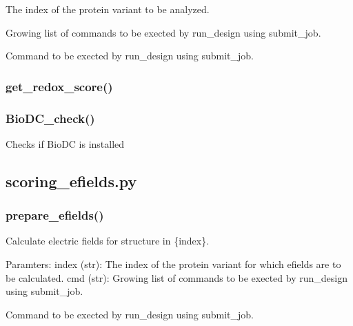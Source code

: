 \documentclass[10pt]{extarticle}
\begin{document}
\par\vspace*{0.5\baselineskip}
{
\begin{description}[noitemsep,topsep=0pt,parsep=0pt,labelwidth=5cm,leftmargin=!,labelindent=0pt,labelsep=0.2cm,itemsep=0pt]
\item[\textcolor{mpgAccentBlue!75!white}{index (str)\dotfill}] The index of the protein variant to be analyzed.
\item[\textcolor{mpgAccentBlue!75!white}{cmd (str)\dotfill}] Growing list of commands to be exected by run\_design using submit\_job.
\end{description}
}
\par\vspace*{0.5\baselineskip}
{
\begin{description}[noitemsep,topsep=0pt,parsep=0pt,labelwidth=5cm,leftmargin=!,labelindent=0pt,labelsep=0.2cm,itemsep=0pt]
\item[\textcolor{mpgAccentBlue!75!white}{cmd (str)\dotfill}] Command to be exected by run\_design using submit\_job.
\end{description}
}
\subsubsection{get\_redox\_score()}
\subsubsection{BioDC\_check()}
Checks if BioDC is installed
\subsection{scoring\_efields.py}
\subsubsection{prepare\_efields()}
Calculate electric fields for structure in \{index\}.

Paramters:
index (str): The index of the protein variant for which efields are to be calculated.
cmd (str): Growing list of commands to be exected by run\_design using submit\_job.

\par\vspace*{0.5\baselineskip}
{
\begin{description}[noitemsep,topsep=0pt,parsep=0pt,labelwidth=5cm,leftmargin=!,labelindent=0pt,labelsep=0.2cm,itemsep=0pt]
\item[\textcolor{mpgAccentBlue!75!white}{cmd (str)\dotfill}] Command to be exected by run\_design using submit\_job.
\end{description}
}
\end{document}
